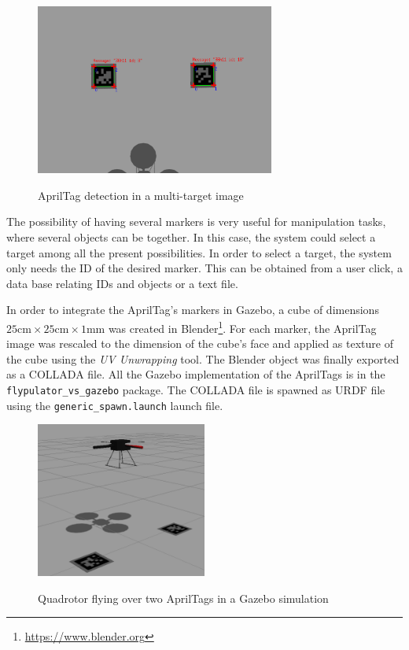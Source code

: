 \begin{figure}[!htb]
	\caption{AprilTag detection in a multi-target image}
	\centering
	\includegraphics[width=0.7\textwidth]{content/chapter_05/images/april-detection.png}
	\label{fig:apriltag-detection}
\end{figure}

The possibility of having several markers is very useful for manipulation tasks, where several objects can be together. In this case, the system could select a target among all the present possibilities. In order to select a target, the system only needs the ID of the desired marker. This can be obtained from a user click, a data base relating IDs and objects or a text file.

 In order to integrate the AprilTag's markers in Gazebo, a cube of dimensions $25\text{cm}\times25\text{cm}\times1\text{mm}$ was created in Blender\footnote{\url{https://www.blender.org}}. For each marker, the AprilTag image was rescaled to the dimension of the cube's face and applied as texture of the cube using the \emph{UV Unwrapping} tool. The Blender object was finally exported as a COLLADA file. All the Gazebo implementation of the AprilTags is in the \texttt{flypulator\_vs\_gazebo} package. The COLLADA file is spawned as URDF file using the \texttt{generic\_spawn.launch} launch file.

\begin{figure}[!htb]
	\caption{Quadrotor flying over two AprilTags in a Gazebo simulation}
	\centering
	\includegraphics[width=0.5\textwidth]{content/chapter_05/images/fly2tags.png}
	\label{fig:fly2tags}
\end{figure}

